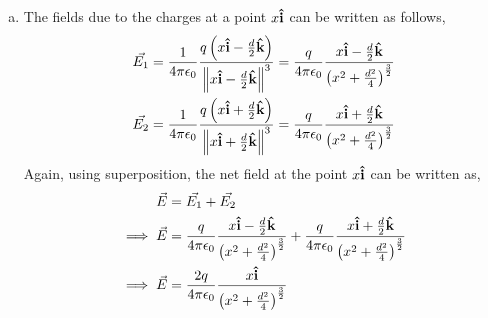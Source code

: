 \begin{problem}{}{}
\begin{enumerate}[(a)]
    \item The fields due to the charges at a point $x \boldsymbol{\hat{\textbf{i}}}$ can be written as follows,
    \begin{align*}
    \vec{E_1} = \frac{1}{4\pi\epsilon_0} \frac{q\left(x\boldsymbol{\hat{\textbf{i}}} - \frac{d}{2}\boldsymbol{\hat{\textbf{k}}}\right)}{\left \Vert x\boldsymbol{\hat{\textbf{i}}} - \frac{d}{2} \boldsymbol{\hat{\textbf{k}}} \right \Vert^3} = \frac{q}{4\pi\epsilon_0} \frac{x\boldsymbol{\hat{\textbf{i}}} - \frac{d}{2}\boldsymbol{\hat{\textbf{k}}}}{\left( x^2+\frac{d^2}{4}\right)^{\frac{3}{2}}}\\
    \vec{E_2} = \frac{1}{4\pi\epsilon_0} \frac{q\left(x\boldsymbol{\hat{\textbf{i}}} + \frac{d}{2}\boldsymbol{\hat{\textbf{k}}}\right)}{\left \Vert x\boldsymbol{\hat{\textbf{i}}} + \frac{d}{2} \boldsymbol{\hat{\textbf{k}}} \right \Vert^3} = \frac{q}{4\pi\epsilon_0} \frac{x\boldsymbol{\hat{\textbf{i}}} + \frac{d}{2}\boldsymbol{\hat{\textbf{k}}}}{\left( x^2+\frac{d^2}{4}\right)^{\frac{3}{2}}}\\
    \end{align*}
    Again, using superposition, the net field at the point $x\boldsymbol{\hat{\textbf{i}}}$ can be written as,
    \begin{align*}
        \vec{E} &= \vec{E_1} + \vec{E_2}\\
        \implies \vec{E} &= \frac{q}{4\pi\epsilon_0} \frac{x\boldsymbol{\hat{\textbf{i}}} - \frac{d}{2}\boldsymbol{\hat{\textbf{k}}}}{\left( x^2+\frac{d^2}{4}\right)^{\frac{3}{2}}} + \frac{q}{4\pi\epsilon_0} \frac{x\boldsymbol{\hat{\textbf{i}}} + \frac{d}{2}\boldsymbol{\hat{\textbf{k}}}}{\left( x^2+\frac{d^2}{4}\right)^{\frac{3}{2}}}
        \\
        \implies \vec{E} &= \frac{2q}{4\pi\epsilon_0}\frac{x\boldsymbol{\hat{\textbf{i}}}}{\left( x^2+\frac{d^2}{4}\right)^{\frac{3}{2}}}
    \end{align*}


\end{enumerate}
\end{problem}
